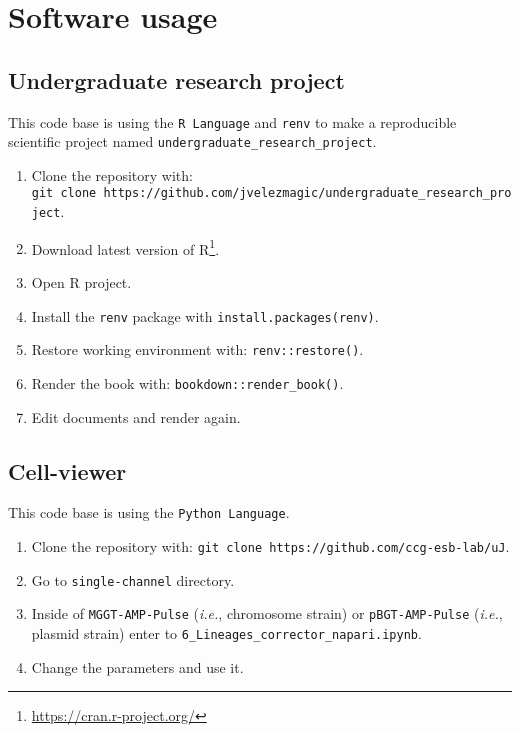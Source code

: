 \documentclass[
  12pt,
  a4paper,
  oneside]{krantz}
\providecommand{\tightlist}{%
  \setlength{\itemsep}{0pt}\setlength{\parskip}{0pt}}
\renewcommand{\href}[2]{#2\footnote{\url{#1}}}
\begin{document}
\hypertarget{software-usage}{%
\chapter{Software usage}\label{software-usage}}

\hypertarget{undergraduate-research-project}{%
\section{Undergraduate research project}\label{undergraduate-research-project}}

This code base is using the \texttt{R\ Language} and \texttt{renv} to make a
reproducible scientific project named \texttt{undergraduate\_research\_project}.

\begin{enumerate}
\def\labelenumi{\arabic{enumi}.}
\tightlist
\item
  Clone the repository with:
  \texttt{git\ clone\ https://github.com/jvelezmagic/undergraduate\_research\_project}.
\item
  Download latest version of \href{https://cran.r-project.org/}{R}.
\item
  Open R project.
\item
  Install the \texttt{renv} package with \texttt{install.packages(\textquotesingle{}renv\textquotesingle{})}.
\item
  Restore working environment with: \texttt{renv::restore()}.
\item
  Render the book with: \texttt{bookdown::render\_book()}.
\item
  Edit documents and render again.
\end{enumerate}

\hypertarget{cell-viewer}{%
\section{Cell-viewer}\label{cell-viewer}}

This code base is using the \texttt{Python\ Language}.

\begin{enumerate}
\def\labelenumi{\arabic{enumi}.}
\tightlist
\item
  Clone the repository with:
  \texttt{git\ clone\ https://github.com/ccg-esb-lab/uJ}.
\item
  Go to \texttt{single-channel} directory.
\item
  Inside of \texttt{MGGT-AMP-Pulse} (\emph{i.e.}, chromosome strain) or
  \texttt{pBGT-AMP-Pulse} (\emph{i.e.}, plasmid strain) enter to
  \texttt{6\_Lineages\_corrector\_napari.ipynb}.
\item
  Change the parameters and use it.
\end{enumerate}
\end{document}
